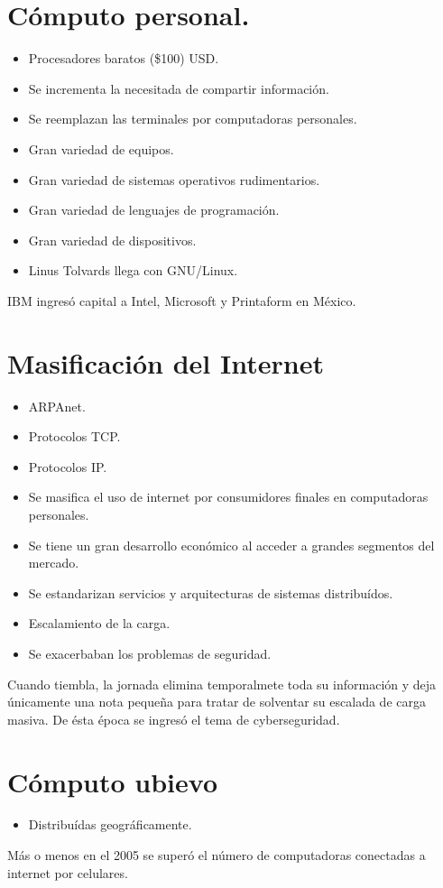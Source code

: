 \chapter{C\'{o}mputo personal.}

\begin{itemize}
	\item Procesadores baratos (\$100) USD.	
	\item Se incrementa la necesitada de compartir informaci\'{o}n.
	\item Se reemplazan las terminales por computadoras personales.
	\item Gran variedad de equipos.
	\item Gran variedad de sistemas operativos rudimentarios.
	\item Gran variedad de lenguajes de programaci\'{o}n.
	\item Gran variedad de dispositivos.
	\item Linus Tolvards llega con GNU/Linux.
\end{itemize}
IBM ingres\'{o} capital a Intel, Microsoft y Printaform en M\'{e}xico.

\chapter{Masificaci\'{o}n del Internet}

\begin{itemize}
	\item ARPAnet.
	\item Protocolos TCP.
	\item Protocolos IP.
	\item Se masifica el uso de internet por consumidores finales en computadoras personales.
	\item Se tiene un gran desarrollo econ\'{o}mico al acceder a grandes segmentos del mercado.
	\item Se estandarizan servicios y arquitecturas de sistemas distribu\'{i}dos.
	\item Escalamiento de la carga.
	\item Se exacerbaban los problemas de seguridad.
\end{itemize}
Cuando tiembla, la jornada elimina temporalmete toda su informaci\'{o}n y deja \'{u}nicamente una nota peque\~{n}a para tratar de solventar su escalada de carga masiva.
De \'{e}sta \'{e}poca se ingres\'{o} el tema de cyberseguridad.

\chapter{C\'{o}mputo ubievo}

\begin{itemize}
	\item Distribu\'{i}das geogr\'{a}ficamente.
\end{itemize}
M\'{a}s o menos en el 2005 se super\'{o} el n\'{u}mero de computadoras conectadas a internet por celulares.
